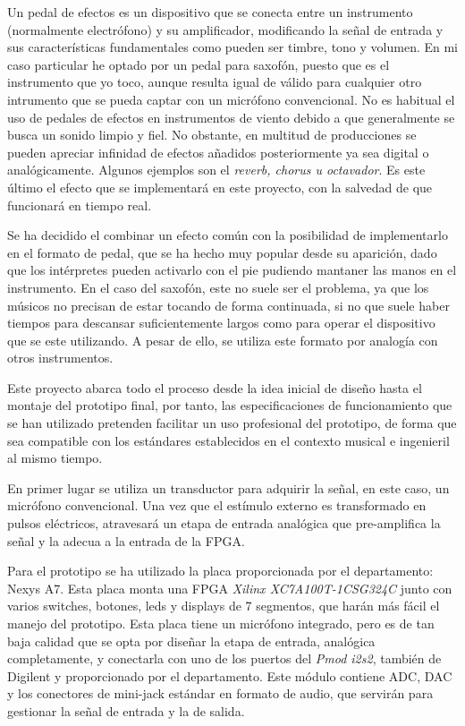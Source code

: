 Un pedal de efectos es un dispositivo que se conecta entre un instrumento (normalmente electrófono) y su amplificador, modificando la señal de entrada y sus características fundamentales como pueden ser timbre, tono y volumen. En mi caso particular he optado por un pedal para saxofón, puesto que es el instrumento que yo toco, aunque resulta igual de válido para cualquier otro intrumento que se pueda captar con un micrófono convencional. No es habitual el uso de pedales de efectos en instrumentos de viento debido a que generalmente se busca un sonido limpio y fiel. No obstante, en multitud de producciones se pueden apreciar infinidad de efectos añadidos posteriormente ya sea digital o analógicamente. Algunos ejemplos son el \emph{reverb, chorus u octavador}. Es este último el efecto que se implementará en este proyecto, con la salvedad de que funcionará en tiempo real. 

Se ha decidido el combinar un efecto común con la posibilidad de implementarlo en el formato de pedal, que se ha hecho muy popular desde su aparición, dado que los intérpretes pueden activarlo con el pie pudiendo mantaner las manos en el instrumento. En el caso del saxofón, este no suele ser el problema, ya que los músicos no precisan de estar tocando de forma continuada, si no que suele haber tiempos para descansar suficientemente largos como para operar el dispositivo que se este utilizando. A pesar de ello, se utiliza este formato por analogía con otros instrumentos.

Este proyecto abarca todo el proceso desde la idea inicial de diseño hasta el montaje del prototipo final, por tanto, las especificaciones de funcionamiento que se han utilizado pretenden facilitar un uso profesional del prototipo, de forma que sea compatible con los estándares establecidos en el contexto musical e ingenieril al mismo tiempo.

En primer lugar se utiliza un transductor para adquirir la señal, en este caso, un micrófono convencional. Una vez que el estímulo externo es transformado en pulsos eléctricos, atravesará un etapa de entrada analógica que pre-amplifica la señal y la adecua a la entrada de la FPGA.

Para el prototipo se ha utilizado la placa proporcionada por el departamento: Nexys A7. Esta placa monta una FPGA \emph{Xilinx XC7A100T-1CSG324C} junto con varios switches, botones, leds y displays de 7 segmentos, que harán más fácil el manejo del prototipo. Esta placa tiene un micrófono integrado, pero es de tan baja calidad que se opta por diseñar la etapa de entrada, analógica completamente, y conectarla con uno de los puertos del \emph{Pmod i2s2}, también de Digilent y proporcionado por el departamento. Este módulo contiene ADC, DAC y los conectores de mini-jack estándar en formato de audio, que servirán para gestionar la señal de entrada y la de salida.

